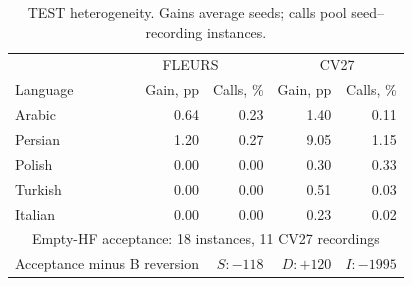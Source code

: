 \begin{table}[t]\centering\footnotesize
\caption{TEST heterogeneity. Gains average seeds; calls pool seed--recording instances.}\label{tab:language}
\setlength{\tabcolsep}{5pt}\renewcommand{\arraystretch}{1.03}
\begin{tabular}{@{}lrrrr@{}}\toprule
 & \multicolumn{2}{c}{FLEURS} & \multicolumn{2}{c}{CV27}\\
Language & Gain, pp & Calls, \% & Gain, pp & Calls, \%\\\midrule
Arabic & 0.64 & 0.23 & 1.40 & 0.11\\
Persian & 1.20 & 0.27 & 9.05 & 1.15\\
Polish & 0.00 & 0.00 & 0.30 & 0.33\\
Turkish & 0.00 & 0.00 & 0.51 & 0.03\\
Italian & 0.00 & 0.00 & 0.23 & 0.02\\
\midrule\multicolumn{5}{c}{Empty-HF acceptance: 18 instances, 11 CV27 recordings}\\
\multicolumn{2}{l}{Acceptance minus B reversion} & $S:-118$ & $D:+120$ & $I:-1995$\\
\bottomrule\end{tabular}\end{table}
